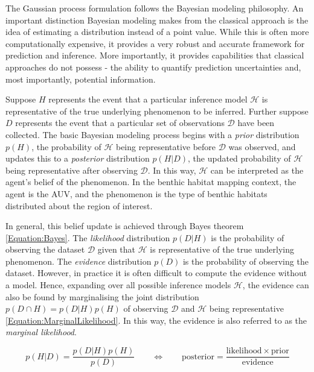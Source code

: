 			The Gaussian process formulation follows the Bayesian modeling philosophy. An important distinction Bayesian modeling makes from the classical approach is the idea of estimating a distribution instead of a point value. While this is often more computationally expensive, it provides a very robust and accurate framework for prediction and inference. More importantly, it provides capabilities that classical approaches do not possess - the ability to quantify prediction uncertainties and, most importantly, potential information. 
			
			Suppose $H$ represents the event that a particular inference model $\mathcal{H}$ is representative of the true underlying phenomenon to be inferred. Further suppose $D$ represents the event that a particular set of observations $\mathcal{D}$ have been collected. The basic Bayesian modeling process begins with a \textit{prior} distribution $p(H)$, the probability of $\mathcal{H}$ being representative before $\mathcal{D}$ was observed, and updates this to a \textit{posterior} distribution $p(H | D)$, the updated probability of $\mathcal{H}$ being representative after observing $\mathcal{D}$. In this way, $\mathcal{H}$ can be interpreted as the agent's belief of the phenomenon. In the benthic habitat mapping context, the agent is the AUV, and the phenomenon is the type of benthic habitats distributed about the region of interest.
			
			In general, this belief update is achieved through Bayes theorem \eqref{Equation:Bayes}. The \textit{likelihood} distribution $p(D | H)$ is the probability of observing the dataset $\mathcal{D}$ given that $\mathcal{H}$ is representative of the true underlying phenomenon. The \textit{evidence} distribution $p(D)$ is the probability of observing the dataset. However, in practice it is often difficult to compute the evidence without a model. Hence, expanding over all possible inference models $\mathcal{H}$, the evidence can also be found by marginalising the joint distribution $p(D \cap H) = p(D | H) p(H)$ of observing $\mathcal{D}$ and $\mathcal{H}$ being representative \eqref{Equation:MarginalLikelihood}. In this way, the evidence is also referred to as the \textit{marginal likelihood}.
			
			\begin{equation}
				p(H | D) = \frac{p(D | H) p(H)}{p(D)} \qquad \Longleftrightarrow \qquad \mathrm{posterior} = \frac{\mathrm{likelihood} \times \mathrm{prior}}{\mathrm{evidence}}
			\label{Equation:Bayes}
			\end{equation}
			
